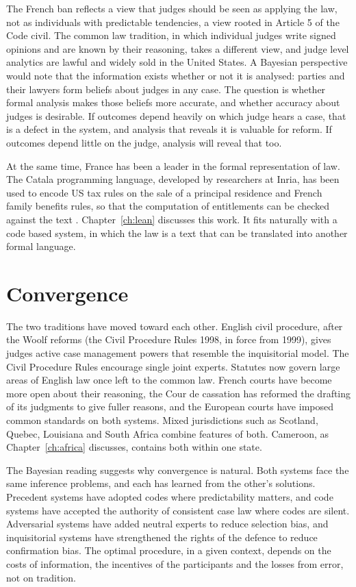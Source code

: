 The French ban reflects a view that judges should be seen as applying the law, not as individuals with predictable tendencies, a view rooted in Article 5 of the Code civil. The common law tradition, in which individual judges write signed opinions and are known by their reasoning, takes a different view, and judge level analytics are lawful and widely sold in the United States. A Bayesian perspective would note that the information exists whether or not it is analysed: parties and their lawyers form beliefs about judges in any case. The question is whether formal analysis makes those beliefs more accurate, and whether accuracy about judges is desirable. If outcomes depend heavily on which judge hears a case, that is a defect in the system, and analysis that reveals it is valuable for reform. If outcomes depend little on the judge, analysis will reveal that too.

At the same time, France has been a leader in the formal representation of law. The Catala programming language, developed by researchers at Inria, has been used to encode US tax rules on the sale of a principal residence and French family benefits rules, so that the computation of entitlements can be checked against the text \citep{merigoux2021}. Chapter~\ref{ch:lean} discusses this work. It fits naturally with a code based system, in which the law is a text that can be translated into another formal language.

\section{Convergence}

The two traditions have moved toward each other. English civil procedure, after the Woolf reforms (the Civil Procedure Rules 1998, in force from 1999), gives judges active case management powers that resemble the inquisitorial model. The Civil Procedure Rules encourage single joint experts. Statutes now govern large areas of English law once left to the common law. French courts have become more open about their reasoning, the Cour de cassation has reformed the drafting of its judgments to give fuller reasons, and the European courts have imposed common standards on both systems. Mixed jurisdictions such as Scotland, Quebec, Louisiana and South Africa combine features of both. Cameroon, as Chapter~\ref{ch:africa} discusses, contains both within one state.

The Bayesian reading suggests why convergence is natural. Both systems face the same inference problems, and each has learned from the other's solutions. Precedent systems have adopted codes where predictability matters, and code systems have accepted the authority of consistent case law where codes are silent. Adversarial systems have added neutral experts to reduce selection bias, and inquisitorial systems have strengthened the rights of the defence to reduce confirmation bias. The optimal procedure, in a given context, depends on the costs of information, the incentives of the participants and the losses from error, not on tradition.

